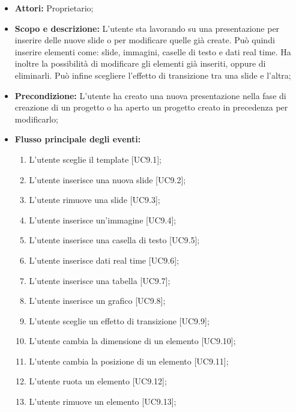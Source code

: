 \begin{itemize}
	\item \textbf{Attori:} Proprietario;
	\item \textbf{Scopo e descrizione:} L'utente sta lavorando su una presentazione per inserire delle nuove \gls{slide} o per modificare quelle già create. Può quindi inserire  elementi come: \gls{slide}, immagini, caselle di testo e dati \gls{real time}. Ha inoltre la possibilità di modificare gli elementi già inseriti, oppure di eliminarli. Può infine scegliere l'effetto di transizione tra una \gls{slide} e l'altra;
	\item \textbf{Precondizione:} L'utente ha creato una nuova presentazione nella fase di creazione di un progetto o ha aperto un progetto creato in precedenza per modificarlo;
	\item \textbf{Flusso principale degli eventi:}
	\begin{enumerate}
		\item L'utente sceglie il \gls{template} [UC9.1];
		
		\item L'utente inserisce una nuova \gls{slide} [UC9.2];
		
		\item L'utente rimuove una \gls{slide} [UC9.3];
		
		\item L'utente inserisce un'immagine [UC9.4];
		
		\item L'utente inserisce una casella di testo [UC9.5];
		
		\item L'utente inserisce dati \gls{real time} [UC9.6];
		
		\item L'utente inserisce una tabella [UC9.7];
		
		\item L'utente inserisce un grafico [UC9.8];
		
		\item L'utente sceglie un effetto di transizione [UC9.9];
		
		\item L'utente cambia la dimensione di un elemento [UC9.10];
		
		\item L'utente cambia la posizione di un elemento [UC9.11];
		
		\item L'utente ruota un elemento [UC9.12];
		
		\item L'utente rimuove un elemento [UC9.13];


\end{enumerate}
\end{itemize}
